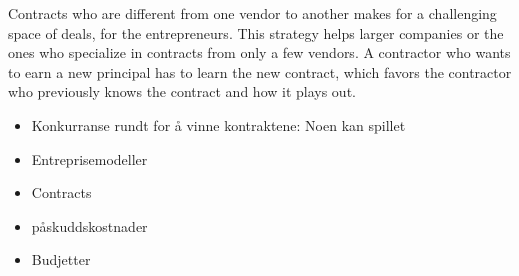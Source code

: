 Contracts who are different from one vendor to another makes for a challenging space of deals, for the entrepreneurs. This strategy helps larger companies or the ones who specialize in contracts from only a few vendors. A contractor who wants to earn a new principal has to learn the new contract, which favors the contractor who previously knows the contract and how it plays out. 

\begin{itemize}
    \item Konkurranse rundt for å vinne kontraktene: Noen kan spillet
    \item Entreprisemodeller
    \item Contracts
    \item påskuddskostnader
    \item Budjetter
\end{itemize}


\cleardoublepage
